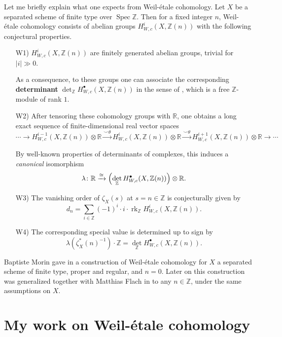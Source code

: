 \documentclass{article}
\DeclareMathOperator{\Spec}{Spec}
\DeclareMathOperator{\rk}{rk}
\newcommand{\ZZ}{\mathbb{Z}}
\newcommand{\RR}{\mathbb{R}}
\begin{document}
Let me briefly explain what one expects from Weil-étale cohomology. Let $X$ be a
separated scheme of finite type over $\Spec \ZZ$. Then for a fixed integer $n$,
Weil-étale cohomology consists of abelian groups $H^i_{W,c} (X,\ZZ(n))$ with the
following conjectural properties.

\begin{enumerate}
\item[W1)] $H^i_{W,c} (X,\ZZ(n))$ are finitely generated abelian groups, trivial
  for $|i| \gg 0$.

  As a consequence, to these groups one can associate the corresponding
  \textbf{determinant} $\det_\ZZ H^\bullet_{W,c} (X, \ZZ(n))$ in the sense of
  \cite{Knudsen-Mumford-1976}, which is a free $\ZZ$-module of rank $1$.

\item[W2)] After tensoring these cohomology groups with $\RR$, one obtains a long
  exact sequence of finite-dimensional real vector spaces
  $$\cdots \to H^{i-1}_{W,c} (X,\ZZ(n)) \otimes \RR \xrightarrow{\smile\theta} H^i_{W,c} (X,\ZZ(n)) \otimes \RR \xrightarrow{\smile\theta} H^{i+1}_{W,c} (X,\ZZ(n)) \otimes \RR \to \cdots$$

  By well-known properties of determinants of complexes, this induces a
  \emph{canonical} isomorphism
  $$\lambda\colon \RR \xrightarrow{\cong} \Bigl(\det_\ZZ H^\bullet_{W,c} (X, \ZZ(n))\Bigr) \otimes \RR.$$

\item[W3)] The vanishing order of $\zeta_X (s)$ at $s = n \in \ZZ$ is
  conjecturally given by
  $$d_n = \sum_{i\in \ZZ} (-1)^i \cdot i \cdot \rk_\ZZ H^i_{W,c} (X,\ZZ(n)).$$

\item[W4)] The corresponding special value is determined up to sign by
  $$\lambda (\zeta_X^* (n)^{-1})\cdot \ZZ = \det_\ZZ H^\bullet_{W,c} (X, \ZZ (n)).$$
\end{enumerate}

Baptiste Morin gave in \cite{Morin-2014} a construction of Weil-étale cohomology
for $X$ a separated scheme of finite type, proper and regular, and
$n = 0$. Later on this construction was generalized together with Matthias Flach
in \cite{Flach-Morin-2018} to any $n \in \ZZ$, under the same assumptions on
$X$.

\section{My work on Weil-étale cohomology}
\end{document}
